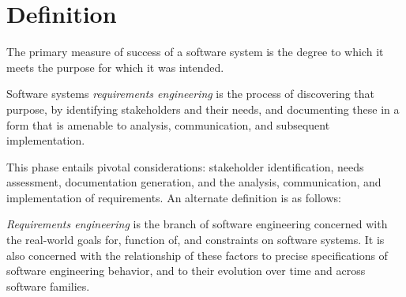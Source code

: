\section{Definition}

The primary measure of success of a software system is the degree to which it meets the purpose for which it was intended.
\begin{definition}
    Software systems \emph{requirements engineering} is the process of discovering that purpose, by identifying stakeholders and their needs, and documenting these in a form that is amenable to analysis, communication, and subsequent implementation. 
\end{definition}
This phase entails pivotal considerations: stakeholder identification, needs assessment, documentation generation, and the analysis, communication, and implementation of requirements. 
An alternate definition is as follows:
\begin{definition}
    \emph{Requirements engineering} is the branch of software engineering concerned with the real-world goals for, function of, and constraints on software systems. 
    It is also concerned with the relationship of these factors to precise specifications of software engineering behavior, and to their evolution over time and across software families. 
\end{definition}